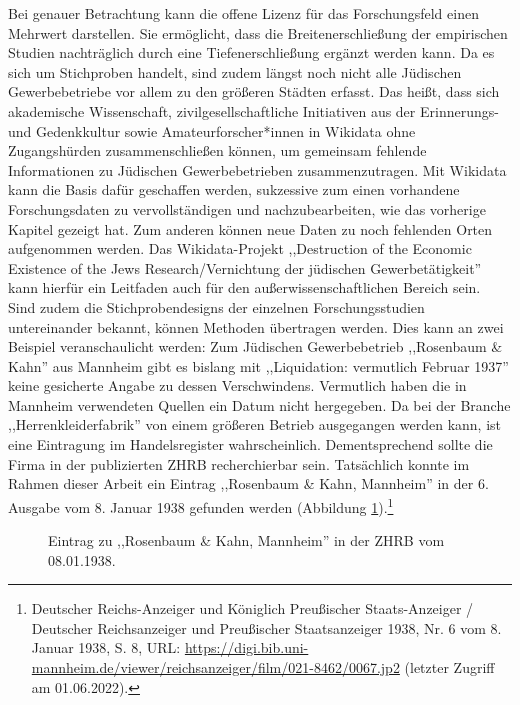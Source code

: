 Bei genauer Betrachtung kann die offene Lizenz für das Forschungsfeld einen Mehrwert darstellen. Sie ermöglicht, dass die Breitenerschließung der empirischen Studien nachträglich durch eine Tiefenerschließung ergänzt werden kann. Da es sich um Stichproben handelt, sind zudem längst noch nicht alle Jüdischen Gewerbebetriebe vor allem zu den größeren Städten erfasst. Das heißt, dass sich akademische Wissenschaft, zivilgesellschaftliche Initiativen aus der Erinnerungs- und Gedenkkultur sowie Amateurforscher*innen in Wikidata ohne Zugangshürden zusammenschließen können, um gemeinsam fehlende Informationen zu Jüdischen Gewerbebetrieben zusammenzutragen. Mit Wikidata kann die Basis dafür geschaffen werden, sukzessive zum einen vorhandene Forschungsdaten zu vervollständigen und nachzubearbeiten, wie das vorherige Kapitel gezeigt hat. Zum anderen können neue Daten zu noch fehlenden Orten aufgenommen werden. Das Wikidata-Projekt ,,Destruction of the Economic Existence of the Jews Research/Vernichtung der jüdischen Gewerbetätigkeit'' kann hierfür ein Leitfaden auch für den außerwissenschaftlichen Bereich sein. Sind zudem die Stichprobendesigns der einzelnen Forschungsstudien untereinander bekannt, können Methoden übertragen werden. Dies kann an zwei Beispiel veranschaulicht werden: Zum Jüdischen Gewerbebetrieb ,,Rosenbaum \& Kahn'' aus Mannheim gibt es bislang mit ,,Liquidation: vermutlich Februar 1937'' keine gesicherte Angabe zu dessen Verschwindens. Vermutlich haben die in Mannheim verwendeten Quellen ein Datum nicht hergegeben. Da bei der Branche ,,Herrenkleiderfabrik'' von einem größeren Betrieb ausgegangen werden kann, ist eine Eintragung im Handelsregister wahrscheinlich. Dementsprechend sollte die Firma in der publizierten ZHRB recherchierbar sein. Tatsächlich konnte im Rahmen dieser Arbeit ein Eintrag ,,Rosenbaum \& Kahn, Mannheim'' in der 6. Ausgabe vom 8. Januar 1938 gefunden werden (Abbildung \ref{fig:zhrbmannheim}).\footnote{Deutscher Reichs-Anzeiger und Königlich Preußischer Staats-Anzeiger / Deutscher Reichsanzeiger und Preußischer Staatsanzeiger 1938, Nr. 6 vom 8. Januar 1938, S. 8, URL: \url{https://digi.bib.uni-mannheim.de/viewer/reichsanzeiger/film/021-8462/0067.jp2} (letzter Zugriff am 01.06.2022).}

\begin{figure}[h]
    \centering
    \caption[ZHRB-Eintrag zu ,,Rosenbaum \& Kahn, Mannheim'']{Eintrag zu ,,Rosenbaum \& Kahn, Mannheim'' in der ZHRB vom 08.01.1938.}
    \label{fig:zhrbmannheim}
\end{figure}

